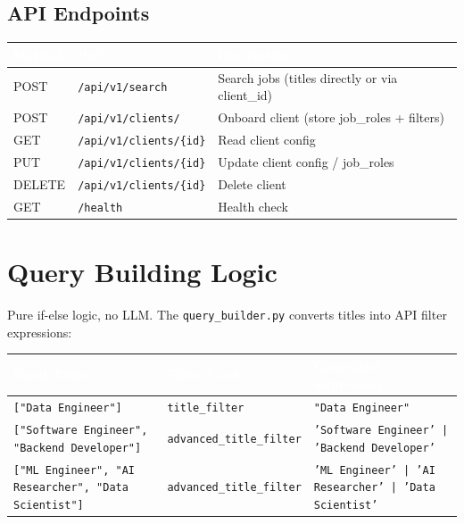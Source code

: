 \documentclass[11pt, a4paper]{article}
\begin{document}
\subsection{API Endpoints}

\begin{center}\small
\begin{tabularx}{\textwidth}{|C{1.3cm}|L{4.5cm}|X|}
\hline
{}
\textcolor{white}{\textbf{Method}} & \textcolor{white}{\textbf{Path}} & \textcolor{white}{\textbf{Description}} \\
\hline
POST & \texttt{/api/v1/search} & Search jobs (titles directly or via client\_id) \\
POST & \texttt{/api/v1/clients/} & Onboard client (store job\_roles + filters) \\
GET & \texttt{/api/v1/clients/\{id\}} & Read client config \\
PUT & \texttt{/api/v1/clients/\{id\}} & Update client config / job\_roles \\
DELETE & \texttt{/api/v1/clients/\{id\}} & Delete client \\
GET & \texttt{/health} & Health check \\
\hline
\end{tabularx}
\end{center}

\section{Query Building Logic}

Pure if-else logic, no LLM. The \texttt{query\_builder.py} converts titles into API filter expressions:

\begin{center}\small
\begin{tabularx}{\textwidth}{|L{4.5cm}|L{3cm}|X|}
\hline
{}
\textcolor{white}{\textbf{Input Titles}} & \textcolor{white}{\textbf{Filter Used}} & \textcolor{white}{\textbf{Generated Expression}} \\
\hline
\texttt{["Data Engineer"]} & \texttt{title\_filter} & \texttt{"Data Engineer"} \\
\texttt{["Software Engineer", "Backend Developer"]} & \texttt{advanced\_title\_filter} & \texttt{'Software Engineer' | 'Backend Developer'} \\
\texttt{["ML Engineer", "AI Researcher", "Data Scientist"]} & \texttt{advanced\_title\_filter} & \texttt{'ML Engineer' | 'AI Researcher' | 'Data Scientist'} \\
\hline
\end{tabularx}
\end{center}
\end{document}

